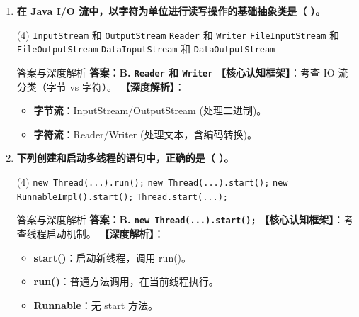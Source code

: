 ﻿\documentclass[12pt, a4paper]{ctexart}
\newcommand{\code}[1]{\texttt{#1}}
\begin{document}
\begin{enumerate}[label=\textbf{\arabic*.}, leftmargin=*, itemsep=1.5em]
	\item \textbf{在 Java I/O 流中，以字符为单位进行读写操作的基础抽象类是（ \quad ）。}
	      \begin{tasks}(4)
		      \task \code{InputStream} 和 \code{OutputStream}
		      \task \code{Reader} 和 \code{Writer}
		      \task \code{FileInputStream} 和 \code{FileOutputStream}
		      \task \code{DataInputStream} 和 \code{DataOutputStream}
	      \end{tasks}
	      \begin{bluebox}{答案与深度解析}
		      \textbf{答案：B. \code{Reader} 和 \code{Writer}}
		      \textbf{【核心认知框架】}：考查 IO 流分类（字节 vs 字符）。
		      \textbf{【深度解析】}：
		      \begin{itemize}[leftmargin=*, nosep]
			      \item \textbf{字节流}：InputStream/OutputStream (处理二进制)。
			      \item \textbf{字符流}：Reader/Writer (处理文本，含编码转换)。
		      \end{itemize}
	      \end{bluebox}

	\item \textbf{下列创建和启动多线程的语句中，正确的是（ \quad ）。}
	      \begin{tasks}(4)
		      \task \code{new Thread(...).run();}
		      \task \code{new Thread(...).start();}
		      \task \code{new RunnableImpl().start();}
		      \task \code{Thread.start(...);}
	      \end{tasks}
	      \begin{bluebox}{答案与深度解析}
		      \textbf{答案：B. \code{new Thread(...).start();}}
		      \textbf{【核心认知框架】}：考查线程启动机制。
		      \textbf{【深度解析】}：
		      \begin{itemize}[leftmargin=*, nosep]
			      \item \textbf{start()}：启动新线程，调用 run()。
			      \item \textbf{run()}：普通方法调用，在当前线程执行。
			      \item \textbf{Runnable}：无 start 方法。
		      \end{itemize}
	      \end{bluebox}


\end{enumerate}
\end{document}
